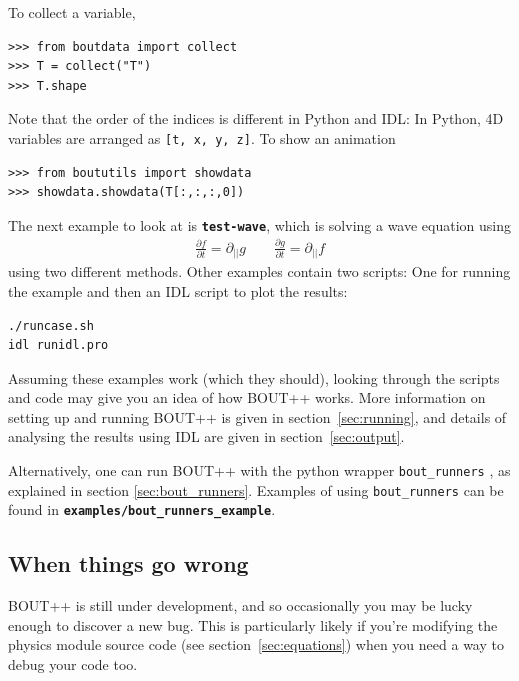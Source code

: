 \documentclass[12pt]{article}
\newcommand{\code}[1]{\texttt{#1}}
\newcommand{\file}[1]{\texttt{\bf #1}}
\newcommand{\deriv}[2]{\ensuremath{\frac{\partial #1}{\partial #2}}}
\begin{document}
%
To collect a variable,
%
\begin{verbatim}
>>> from boutdata import collect
>>> T = collect("T")
>>> T.shape
\end{verbatim}
%
Note that the order of the indices is different in Python and IDL: In Python,
4D variables are arranged as \code{[t, x, y, z]}.  To show an animation
%
\begin{verbatim}
>>> from boututils import showdata
>>> showdata.showdata(T[:,:,:,0])
\end{verbatim}
%
The next example to look at is \file{test-wave}, which is solving a wave
equation using
%
\begin{align}
\deriv{f}{t} = \partial_{||} g \qquad \deriv{g}{t} = \partial_{||} f
\end{align}
%
using two different methods. Other examples contain two scripts: One for
running the example and then an IDL script to plot the results:
%
\begin{verbatim}
./runcase.sh
idl runidl.pro
\end{verbatim}
%
Assuming these examples work (which they should), looking through the scripts
and code may give you an idea of how BOUT++ works. More information on setting
up and running BOUT++ is given in section~\ref{sec:running}, and details of
analysing the results using IDL are given in section~\ref{sec:output}.

Alternatively, one can run BOUT++ with the python wrapper
%
\lstinline!bout_runners!
%
, as explained in section \ref{sec:bout_runners}. Examples of using
%
\lstinline!bout_runners!
%
can be found in \file{examples/bout\_runners\_example}.



\subsection{When things go wrong}
%
BOUT++ is still under development, and so occasionally you may be lucky enough
to discover a new bug. This is particularly likely if you're modifying the
physics module source code (see section~\ref{sec:equations}) when you need a
way to debug your code too.
\end{document}
